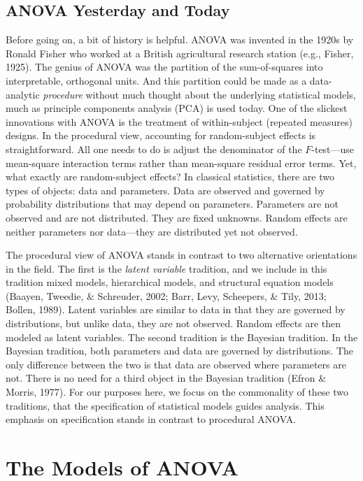 \documentclass[
  english,
  ,man]{apa6}
\begin{document}
\hypertarget{anova-yesterday-and-today}{%
\subsection{ANOVA Yesterday and Today}\label{anova-yesterday-and-today}}

Before going on, a bit of history is helpful. ANOVA was invented in the 1920s by Ronald Fisher who worked at a British agricultural research station (e.g., Fisher, 1925). The genius of ANOVA was the partition of the sum-of-squares into interpretable, orthogonal units. And this partition could be made as a data-analytic \emph{procedure} without much thought about the underlying statistical models, much as principle components analysis (PCA) is used today. One of the slickest innovations with ANOVA is the treatment of within-subject (repeated measures) designs. In the procedural view, accounting for random-subject effects is straightforward. All one needs to do is adjust the denominator of the \(F\)-test---use mean-square interaction terms rather than mean-square residual error terms. Yet, what exactly are random-subject effects? In classical statistics, there are two types of objects: data and parameters. Data are observed and governed by probability distributions that may depend on parameters. Parameters are not observed and are not distributed. They are fixed unknowns. Random effects are neither parameters nor data---they are distributed yet not observed.

The procedural view of ANOVA stands in contrast to two alternative orientations in the field. The first is the \emph{latent variable} tradition, and we include in this tradition mixed models, hierarchical models, and structural equation models (Baayen, Tweedie, \& Schreuder, 2002; Barr, Levy, Scheepers, \& Tily, 2013; Bollen, 1989). Latent variables are similar to data in that they are governed by distributions, but unlike data, they are not observed. Random effects are then modeled as latent variables. The second tradition is the Bayesian tradition. In the Bayesian tradition, both parameters and data are governed by distributions. The only difference between the two is that data are observed where parameters are not. There is no need for a third object in the Bayesian tradition (Efron \& Morris, 1977). For our purposes here, we focus on the commonality of these two traditions, that the specification of statistical models guides analysis. This emphasis on specification stands in contrast to procedural ANOVA.

\hypertarget{the-models-of-anova}{%
\section{The Models of ANOVA}\label{the-models-of-anova}}
\end{document}
